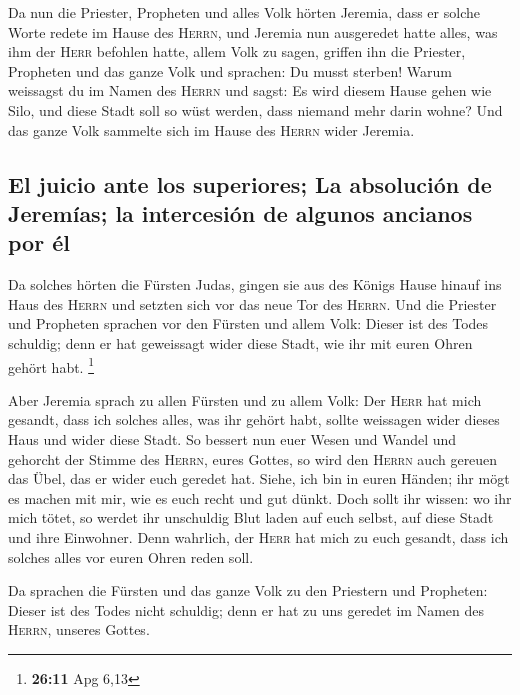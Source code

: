  Da nun die Priester, Propheten und alles Volk hörten
Jeremia, dass er solche Worte redete im Hause des \textsc{Herrn},
 und Jeremia nun ausgeredet hatte alles, was ihm der
\textsc{Herr} befohlen hatte, allem Volk zu sagen, griffen ihn die
Priester, Propheten und das ganze Volk und sprachen: Du musst sterben!
 Warum weissagst du im Namen des \textsc{Herrn} und sagst:
Es wird diesem Hause gehen wie Silo, und diese Stadt soll so wüst
werden, dass niemand mehr darin wohne? Und das ganze Volk sammelte sich
im Hause des \textsc{Herrn} wider Jeremia.

\hypertarget{el-juicio-ante-los-superiores-la-absoluciuxf3n-de-jeremuxedas-la-intercesiuxf3n-de-algunos-ancianos-por-uxe9l}{%
\subsection{El juicio ante los superiores; La absolución de Jeremías; la
intercesión de algunos ancianos por
él}\label{el-juicio-ante-los-superiores-la-absoluciuxf3n-de-jeremuxedas-la-intercesiuxf3n-de-algunos-ancianos-por-uxe9l}}

 Da solches hörten die Fürsten Judas, gingen sie aus des
Königs Hause hinauf ins Haus des \textsc{Herrn} und setzten sich vor das
neue Tor des \textsc{Herrn}.  Und die Priester und
Propheten sprachen vor den Fürsten und allem Volk: Dieser ist des Todes
schuldig; denn er hat geweissagt wider diese Stadt, wie ihr mit euren
Ohren gehört habt. \footnote{\textbf{26:11} Apg 6,13}

 Aber Jeremia sprach zu allen Fürsten und zu allem Volk:
Der \textsc{Herr} hat mich gesandt, dass ich solches alles, was ihr
gehört habt, sollte weissagen wider dieses Haus und wider diese Stadt.
 So bessert nun euer Wesen und Wandel und gehorcht der
Stimme des \textsc{Herrn}, eures Gottes, so wird den \textsc{Herrn} auch
gereuen das Übel, das er wider euch geredet hat.  Siehe,
ich bin in euren Händen; ihr mögt es machen mit mir, wie es euch recht
und gut dünkt.  Doch sollt ihr wissen: wo ihr mich tötet,
so werdet ihr unschuldig Blut laden auf euch selbst, auf diese Stadt und
ihre Einwohner. Denn wahrlich, der \textsc{Herr} hat mich zu euch
gesandt, dass ich solches alles vor euren Ohren reden soll.

 Da sprachen die Fürsten und das ganze Volk zu den
Priestern und Propheten: Dieser ist des Todes nicht schuldig; denn er
hat zu uns geredet im Namen des \textsc{Herrn}, unseres Gottes.

